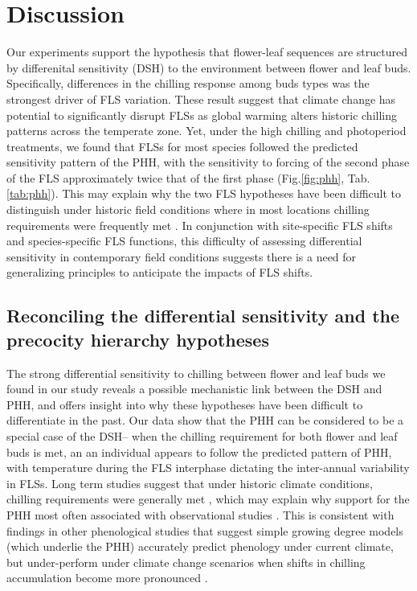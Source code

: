 \documentclass[11pt]{article}\usepackage[]{graphicx}\usepackage[]{color}
\begin{document}
\section*{Discussion}
\noindent Our experiments support the hypothesis that flower-leaf sequences are structured by differenital sensitivity (DSH) to the environment between flower and leaf buds. Specifically, differences in the chilling response among buds types was the strongest driver of FLS variation. These result suggest that climate change has potential to significantly disrupt FLSs as global warming alters historic chilling patterns across the temperate zone. %
Yet, under the high chilling and photoperiod treatments, we found that FLSs for most species followed the predicted sensitivity pattern of the PHH, with the sensitivity to forcing of the second phase of the FLS approximately twice that of the first phase (Fig.\ref{fig:phh}, Tab. \ref{tab:phh}). This may explain why the two FLS hypotheses have been difficult to distinguish under historic field conditions where in most locations chilling requirements were frequently met \citep{Gauzere2019}. In conjunction with site-specific FLS shifts and species-specific FLS functions, this difficulty of assessing differential sensitivity in contemporary field conditions suggests there is a need for generalizing principles to anticipate the impacts of FLS shifts.\\

\subsection*{Reconciling the differential sensitivity and the precocity hierarchy hypotheses}

\noindent The strong differential sensitivity to chilling between flower and leaf buds we found in our study reveals a possible mechanistic link between the DSH and PHH, and offers insight into why these hypotheses have been difficult to differentiate in the past. Our data show that the PHH can be considered to be a special case of the DSH-- when the chilling requirement for both flower and leaf buds is met, an an individual appears to follow the predicted pattern of PHH, with temperature during the FLS interphase dictating the inter-annual variability in FLSs. Long term studies suggest that under historic climate conditions, chilling requirements were generally met \citep{Gauzere2019,Chuine:2016aa}, which may explain why support for the PHH most often associated with observational studies \citep[e.g.][]{COSMULESCU:2020aa,Guo2014}. This is consistent with findings in other phenological studies that suggest simple growing degree models (which underlie the PHH) accurately predict phenology under current climate, but under-perform under climate change scenarios when shifts in chilling accumulation become more pronounced \citep{Linkosalo2008,Chuine:2016aa}.\\ 
\end{document}

